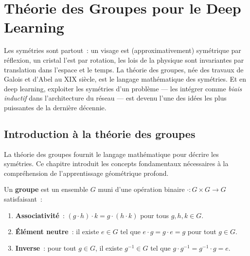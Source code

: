 \chapter{Th\'eorie des Groupes pour le Deep Learning}
\label{ch:groupes}

Les sym\'etries sont partout~: un visage est (approximativement) sym\'etrique
par r\'eflexion, un cristal l'est par rotation, les lois de la physique sont
invariantes par translation dans l'espace et le temps. La th\'eorie des
groupes, n\'ee des travaux de Galois et d'Abel au XIX\ieme{} si\`ecle, est le
langage math\'ematique des sym\'etries. Et en deep learning, exploiter les
sym\'etries d'un probl\`eme --- les int\'egrer comme \emph{biais inductif} dans
l'architecture du r\'eseau --- est devenu l'une des id\'ees les plus
puissantes de la derni\`ere d\'ecennie.

\section{Introduction \`a la th\'eorie des groupes}

La th\'eorie des groupes fournit le langage math\'ematique pour d\'ecrire les
sym\'etries. Ce chapitre introduit les concepts fondamentaux n\'ecessaires \`a
la compr\'ehension de l'apprentissage g\'eom\'etrique profond.

\begin{definition}[Groupe]
Un \textbf{groupe} est un ensemble $G$ muni d'une op\'eration binaire
$\cdot: G \times G \to G$ satisfaisant~:
\begin{enumerate}
    \item \textbf{Associativit\'e}~: $(g \cdot h) \cdot k = g \cdot (h \cdot k)$
          pour tous $g, h, k \in G$.
    \item \textbf{\'El\'ement neutre}~: il existe $e \in G$ tel que
          $e \cdot g = g \cdot e = g$ pour tout $g \in G$.
    \item \textbf{Inverse}~: pour tout $g \in G$, il existe $g^{-1} \in G$ tel que
          $g \cdot g^{-1} = g^{-1} \cdot g = e$.
\end{enumerate}
\end{definition}

